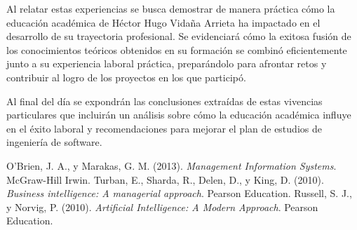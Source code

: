 \documentclass[final, fmstyle, 12pt]{article}
\begin{document}
Al relatar estas experiencias se busca demostrar de manera práctica cómo la educación académica de Héctor Hugo Vidaña Arrieta ha impactado en el desarrollo de su trayectoria profesional. Se evidenciará cómo la exitosa fusión de los conocimientos teóricos obtenidos en su formación se combinó eficientemente junto a su experiencia laboral práctica, preparándolo para afrontar retos y contribuir al logro de los proyectos en los que participó. 

Al final del día se expondrán las conclusiones extraídas de estas vivencias particulares que incluirán un análisis sobre cómo la educación académica influye en el éxito laboral y recomendaciones para mejorar el plan de estudios de ingeniería de software.
\newpage
\tableofcontents 

\newpage 


\newpage 


\newpage 

\newpage 


\newpage

% 
\begin{thebibliography}{99}
     O'Brien, J. A., y Marakas, G. M. (2013). \textit{Management Information Systems}. McGraw-Hill Irwin.
     Turban, E., Sharda, R., Delen, D., y King, D. (2010). \textit{Business intelligence: A managerial approach}. Pearson Education.
     Russell, S. J., y Norvig, P. (2010). \textit{Artificial Intelligence: A Modern Approach}. Pearson Education.
\end{thebibliography}
\end{document}
